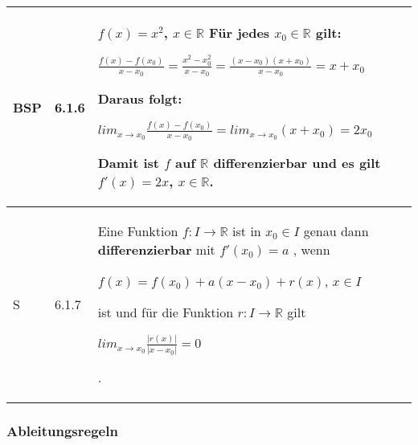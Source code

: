 \begin{longtable}{p{0.75cm} p{1cm} p{16cm}}
        \midrule
        BSP & 6.1.6 &   $f(x) = x^2$, $x \in \mathbb{R}$ \hfill \break
                        Für jedes $x_0 \in \mathbb{R}$ gilt: \hfill \break
                        \centerline{$\frac{f(x)-f(x_0)}{x-x_0}= \frac{x^2-x_0^2}{x-x_0} = \frac{(x-x_0)(x+x_0)}{x-x_0} = x+x_0$}
                        Daraus folgt: \hfill \break
                        \centerline{$lim_{x \rightarrow x_0} \frac{f(x)-f(x_0)}{x-x_0} = lim_{x \rightarrow x_0}(x+x_0) = 2x_0$}
                        Damit ist $f$ auf $\mathbb{R}$ differenzierbar und es gilt $f'(x) = 2x$, $x \in \mathbb{R}$. \\
        \midrule
        S   & 6.1.7 &   Eine Funktion $f: I \rightarrow \mathbb{R}$ ist in $x_0 \in I$ genau dann \textbf{differenzierbar} mit $f'(x_0)=a$
                        , wenn \hfill \break
                        \centerline{$f(x) = f(x_0) + a(x-x_0)+r(x)$, $x \in I$}
                        ist und für die Funktion $r: I \rightarrow \mathbb{R}$ gilt \hfill \break
                        \centerline{$lim_{x \rightarrow x_0}\frac{|r(x)|}{|x-x_0|} = 0$}. \\
        
        \bottomrule

    \end{longtable}

\subsubsection{Ableitungsregeln}

